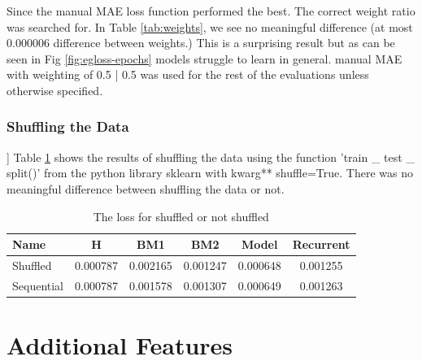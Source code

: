 Since the manual MAE loss function performed the best. The correct weight ratio was searched for. In Table \ref{tab:weights}, we see no meaningful difference (at most 0.000006 difference between weights.) This is a surprising result but as can be seen in Fig \ref{fig:egloss-epochs} models struggle to learn in general. manual MAE with weighting of 0.5 | 0.5 was used for the rest of the evaluations unless otherwise specified.

\subsubsection*{Shuffling the Data}]
Table \ref{tab:suffle} shows the results of shuffling the data using the function 'train \_ test \_ split()' from the python library sklearn with kwarg** shuffle=True. There was no meaningful difference between shuffling the data or not.
\begin{table}[h]
	\centering
	\caption{The loss for shuffled or not shuffled}
	\label{tab:suffle}
	\begin{tabular}{p{2cm}ccccc}
		\toprule
		Name &  H &  BM1 &  BM2 &  Model &  Recurrent \\
		\midrule
		Shuffled &       0.000787 &        0.002165 &        0.001247 &   0.000648 &            0.001255 \\
		Sequential &       0.000787 &        0.001578 &        0.001307 &   0.000649 &            0.001263 \\
		\bottomrule
	\end{tabular}
\end{table}

\section{Additional Features}


